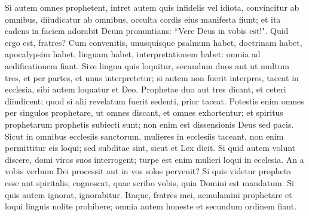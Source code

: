 \begin{biblechapter}
\verse Si autem omnes prophetent, intret autem quis infidelis vel idiota, convincitur ab omnibus, diiudicatur ab omnibus, 
\verse occulta cordis eius manifesta fiunt; et ita cadens in faciem adorabit Deum pronuntians: “Vere Deus in vobis est!". 
\verse Quid ergo est, fratres? Cum convenitis, unusquisque psalmum habet, doctrinam habet, apocalypsim habet, linguam habet, interpretationem habet: omnia ad aedificationem fiant. 
\verse Sive lingua quis loquitur, secundum duos aut ut multum tres, et per partes, et unus interpretetur; 
\verse si autem non fuerit interpres, taceat in ecclesia, sibi autem loquatur et Deo. 
\verse Prophetae duo aut tres dicant, et ceteri diiudicent; 
\verse quod si alii revelatum fuerit sedenti, prior taceat. 
\verse Potestis enim omnes per singulos prophetare, ut omnes discant, et omnes exhortentur; 
\verse et spiritus prophetarum prophetis subiecti sunt; 
\verse non enim est dissensionis Deus sed pacis. Sicut in omnibus ecclesiis sanctorum, 
\verse mulieres in ecclesiis taceant, non enim permittitur eis loqui; sed subditae sint, sicut et Lex dicit. 
\verse Si quid autem volunt discere, domi viros suos interrogent; turpe est enim mulieri loqui in ecclesia. 
\verse An a vobis verbum Dei processit aut in vos solos pervenit? 
\verse Si quis videtur propheta esse aut spiritalis, cognoscat, quae scribo vobis, quia Domini est mandatum. 
\verse Si quis autem ignorat, ignorabitur. 
\verse Itaque, fratres mei, aemulamini prophetare et loqui linguis nolite prohibere; 
\verse omnia autem honeste et secundum ordinem fiant. 
\end{biblechapter}

